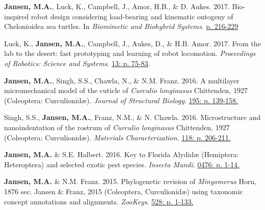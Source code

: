 \documentclass[12pt,a4paper]{article}
\begin{document}
\begin{description}
		\item \textbf{Jansen, M.A.}, Luck, K., Campbell, J., Amor, H.B., \& D. Aukes. 2017. Bio-inspired robot design considering load-bearing and kinematic ontogeny of Chelonioidea sea turtles. In \textit{Biomimetic and Biohybrid Systems}. \href{http://www.springer.com/us/book/9783319635361}{p. 216-229}
		
		\item Luck, K., \textbf{Jansen, M.A.}, Campbell, J., Aukes, D., \& H.B. Amor. 2017. From the lab to the desert: fast prototyping and learning of robot locomotion. \textit{Proceedings of Robotics: Science and Systems}. \href{http://www.roboticsproceedings.org/rss13/p75.html}{13: p. 75-83}.
		
		\item \textbf{Jansen, M.A.}, Singh, S.S., Chawla, N., \& N.M. Franz. 2016. A multilayer micromechanical model of the cuticle of \textit{Curculio longinasus} Chittenden, 1927 (Coleoptera: Curculionid\ae). \textit{Journal of Structural Biology}. \href{http://www.sciencedirect.com/science/article/pii/S1047847716300922}{195: p. 139-158.}
		
		\item Singh, S.S., \textbf{Jansen, M.A.}, Franz, N.M., \& N. Chawla. 2016. Microstructure and nanoindentation of the rostrum of \textit{Curculio longinasus} Chittenden, 1927 (Coleoptera: Curculionid\ae). \textit{Materials Characterization}. \href{http://www.sciencedirect.com/science/article/pii/S1044580316301619}{118: p. 206-211.}
		
		\item \textbf{Jansen, M.A.} \& S.E. Halbert. 2016. Key to Florida Alydid{\ae} (Hemiptera: Heteroptera) and selected exotic pest species. \textit{Insecta Mundi}. \href{http://journals.fcla.edu/mundi/article/view/87952/84644}{0476: p. 1-14.}
		
		\item \textbf{Jansen, M.A.} \& N.M. Franz. 2015. Phylogenetic revision of \textit{Minyomerus} Horn, 1876 sec. Jansen \& Franz, 2015 (Coleoptera, Curculionid\ae) using taxonomic concept annotations and alignments. \textit{ZooKeys}. \href{http://zookeys.pensoft.net/articles.php?id=6001}{528: p. 1-133.}
	\end{description}
	
\end{document}
